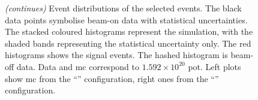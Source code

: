 \begin{figure}[]
\ContinuedFloat
\centering
{} \quad
{} \quad
{} \quad
{} \quad
\caption[Distribution of Selected Events ($\phi$, multiplicity)]{\emph{(continues)} Event distributions of the selected events. The black data points symbolise beam-on data with statistical uncertainties. The stacked coloured histograms represent the simulation, with the shaded bands representing the statistical uncertainty only. The red histograms shows the signal events. The hashed histogram is beam-off data. Data and \acrshort{mc} correspond to $1.592 \times 10^{20}$ \acrshort{pot}. Left plots show \acrshort{mc} from the ``\tuneone'' configuration, right ones from the ``\tunethree'' configuration.}
\label{fig:final_dist}
\end{figure}
